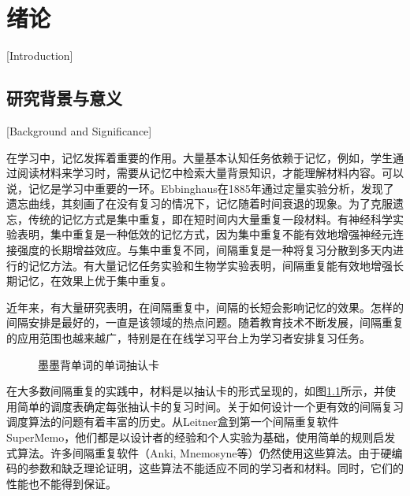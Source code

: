 
\chapter{绪论}[Introduction]

\section{研究背景与意义}[Background and Significance]

在学习中，记忆发挥着重要的作用。大量基本认知任务依赖于记忆，例如，学生通过阅读材料来学习时，需要从记忆中检索大量背景知识，才能理解材料内容\cite{reisbergCognitionExploringScience2019}。可以说，记忆是学习中重要的一环。Ebbinghaus在1885年通过定量实验分析，发现了遗忘曲线，其刻画了在没有复习的情况下，记忆随着时间衰退的现象\cite{ebbinghausMemoryContributionExperimental1913}。为了克服遗忘，传统的记忆方式是集中重复，即在短时间内大量重复一段材料。有神经科学实验表明，集中重复是一种低效的记忆方式，因为集中重复不能有效地增强神经元连接强度的长期增益效应\cite{kramarSynapticEvidenceEfficacy2012}。与集中重复不同，间隔重复是一种将复习分散到多天内进行的记忆方法。有大量记忆任务实验\cite{cepedaDistributedPracticeVerbal2006}和生物学实验\cite{smolenRightTimeLearn2016}表明，间隔重复能有效地增强长期记忆，在效果上优于集中重复。

近年来，有大量研究表明，在间隔重复中，间隔的长短会影响记忆的效果\cite{cepedaSpacingEffectsLearning2008,delaneySpacingTestingEffects2010}。怎样的间隔安排是最好的，一直是该领域的热点问题。随着教育技术不断发展，间隔重复的应用范围也越来越广，特别是在在线学习平台上为学习者安排复习任务。

\begin{figure}[htb]
    \setlength{\subfigcapskip}{-1bp}
    \centering
    \begin{minipage}{\textwidth}
    \centering
    \subfigure{\label{fig:flashcard:front}}\addtocounter{subfigure}{-2}
    \hspace{2em}
    \subfigure{\label{fig:flashcard:back}}\addtocounter{subfigure}{-2}
    \end{minipage}
    \vspace{0.2em}
    \caption{墨墨背单词的单词抽认卡}
    \label{fig:flashcard}
\end{figure}

在大多数间隔重复的实践中，材料是以抽认卡的形式呈现的，如图\ref{fig:flashcard}所示，并使用简单的调度表确定每张抽认卡的复习时间。关于如何设计一个更有效的间隔复习调度算法的问题有着丰富的历史。从Leitner盒到第一个间隔重复软件SuperMemo，他们都是以设计者的经验和个人实验为基础，使用简单的规则启发式算法。许多间隔重复软件（Anki, Mnemosyne等）仍然使用这些算法。由于硬编码的参数和缺乏理论证明，这些算法不能适应不同的学习者和材料。同时，它们的性能也不能得到保证。

